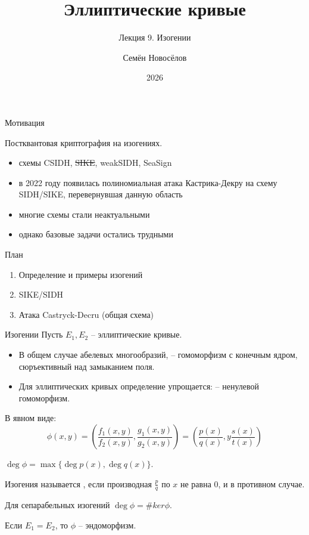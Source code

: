 \documentclass{beamer}
\title{Эллиптические кривые}
\subtitle{Лекция 9. Изогении}
\author{Семён Новосёлов}
\institute{БФУ им. И. Канта}
\date{2026}
\begin{document}
\frame{\titlepage}

\begin{frame}{Мотивация}
	
Постквантовая криптография на изогениях.
\vspace{0.5em}
	
\begin{itemize}
	\item схемы CSIDH, \sout{SIKE}, weakSIDH, SeaSign
	\item в 2022 году появилась полиномиальная атака Кастрика-Декру на схему SIDH/SIKE, перевернувшая данную область
	\item многие схемы стали неактуальными
	\item однако базовые задачи остались трудными
\end{itemize}
\end{frame}

\begin{frame}{План}
\begin{enumerate}
	\item Определение и примеры изогений
	\item SIKE/SIDH
	\item Атака Castryck-Decru (общая схема)
\end{enumerate}
\end{frame}

\begin{frame}{Изогении}
Пусть $E_1, E_2$ -- эллиптические кривые.

\begin{itemize}
    \item В общем случае абелевых многообразий,  -- гомоморфизм с конечным ядром, сюръективный над замыканием поля.
    \item Для эллиптических кривых определение упрощается:  -- ненулевой гомоморфизм.
\end{itemize}
\end{frame}

\begin{frame}
    В явном виде:
	\[
	\phi(x, y) = \left( \frac{f_1(x,y)}{f_2(x,y)}, \frac{g_1(x,y)}{g_2(x,y)} \right)
	=
	\left(
	\frac{p(x)}{q(x)}, y \frac{s(x)}{t(x)}
	\right)
	\]
	
	\vspace*{1em}
	 $\deg\phi = \max\{\deg{p(x)}, \deg{q(x)}\}$.
	
	\vspace{1em}
	Изогения называется , если производная $\frac{p}{q}$ по $x$ не равна $0$, и  в противном случае.
	
	\vspace{1em}
	Для сепарабельных изогений $\deg\phi = \#ker\phi$.
	
	\vspace{1em}
	Если $E_1 = E_2$, то $\phi$ -- эндоморфизм.
	
\end{frame}
\end{document}
